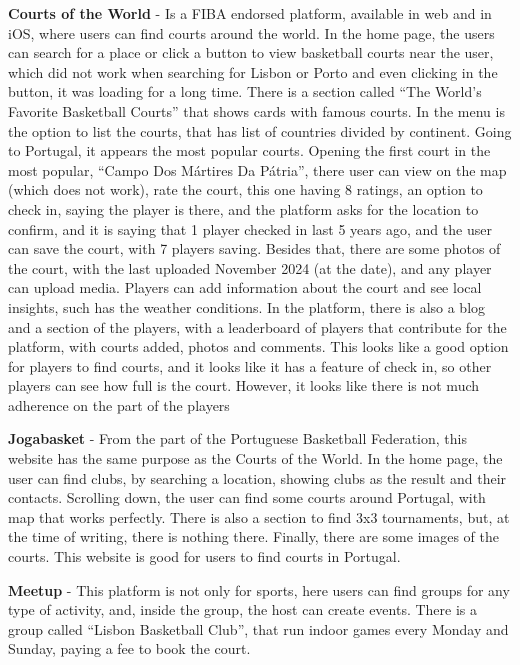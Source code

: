 \textbf{Courts of the World}\cite{fiba-courts} - Is a FIBA endorsed platform, available in web and in iOS, where users can find courts around the world.
In the home page, the users can search for a place or click a button to view basketball courts near the user, which did not work when searching for Lisbon or Porto and even clicking in the button, it was loading for a long time.
There is a section called ``The World’s Favorite Basketball Courts'' that shows cards with famous courts.
In the menu is the option to list the courts, that has list of countries divided by continent.
Going to Portugal, it appears the most popular courts.
Opening the first court in the most popular, ``Campo Dos Mártires Da Pátria'', there user can view on the map (which does not work), rate the court, this one having 8 ratings, an option to check in, saying the player is there, and the platform asks for the location to confirm, and it is saying that 1 player checked in last 5 years ago, and the user can save the court, with 7 players saving.
Besides that, there are some photos of the court, with the last uploaded November 2024 (at the date), and any player can upload media.
Players can add information about the court and see local insights, such has the weather conditions.
In the platform, there is also a blog and a section of the players, with a leaderboard of players that contribute for the platform, with courts added, photos and comments.
This looks like a good option for players to find courts, and it looks like it has a feature of check in, so other players can see how full is the court.
However, it looks like there is not much adherence on the part of the players

\textbf{Jogabasket}\cite{jogabasket} - From the part of the Portuguese Basketball Federation, this website has the same purpose as the Courts of the World.
In the home page, the user can find clubs, by searching a location, showing clubs as the result and their contacts.
Scrolling down, the user can find some courts around Portugal, with map that works perfectly.
There is also a section to find 3x3 tournaments, but, at the time of writing, there is nothing there.
Finally, there are some images of the courts.
This website is good for users to find courts in Portugal.

\textbf{Meetup}\cite{meetup} - This platform is not only for sports, here users can find groups for any type of activity, and, inside the group, the host can create events.
There is a group called ``Lisbon Basketball Club''\cite{meetup-basketball-group}, that run indoor games every Monday and Sunday, paying a fee to book the court.

